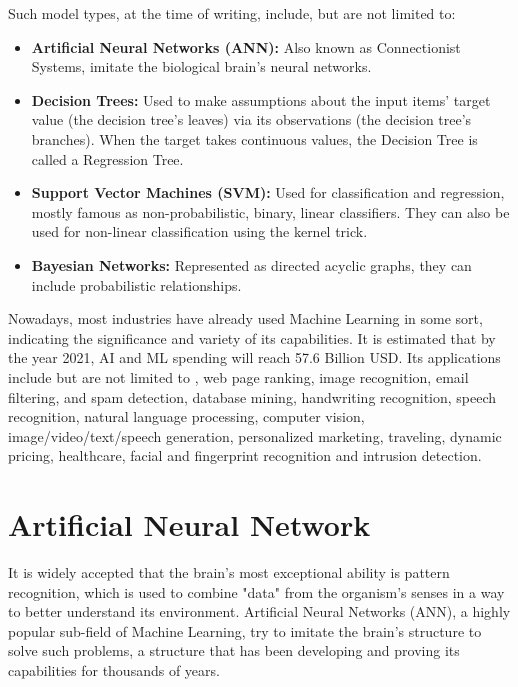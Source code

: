 Such model types, at the time of writing, include, but are not limited to:
\begin{itemize}
	\item \textbf{Artificial Neural Networks (ANN):} Also known as Connectionist Systems, imitate the biological brain's neural networks.
	\item \textbf{Decision Trees:} Used to make assumptions about the input items' target value (the decision tree's leaves) via its observations (the decision tree's branches). When the target takes continuous values, the Decision Tree is called a Regression Tree.
	\item \textbf{Support Vector Machines (SVM):} Used for classification and regression, most\-ly famous as non-probabilistic, binary, linear classifiers. They can also be used for non-linear classification using the kernel trick.
	\item \textbf{Bayesian Networks:} Represented as directed acyclic graphs, they can include probabilistic relationships.
\end{itemize}

Nowadays, most industries have already used Machine Learning in some sort, indicating the significance and variety of its capabilities. It is estimated \cite{Machine-Learning-Applications} that by the year 2021, AI and ML spending will reach 57.6 Billion USD. Its applications include but are not limited to \cite{Top-Machine-Learning-Applications-in-2019} \cite{Roundup-Of-Machine-Learning-Forecasts-And-Market-Estimates}, web page ranking, image recognition, email filtering, and spam detection, database mining, handwriting recognition, speech recognition, natural language processing, computer vision, image/video/text/speech generation, personalized marketing, traveling, dynamic pricing, healthcare, facial and fingerprint recognition and intrusion detection.

\section{Artificial Neural Network}
It is widely accepted that the brain's most exceptional ability is pattern recognition, which is used to combine "data" from the organism's senses in a way to better understand its environment. Artificial Neural Networks (ANN), a highly popular sub-field of Machine Learning, try to imitate the brain's structure to solve such problems, a structure that has been developing and proving its capabilities for thousands of years.

